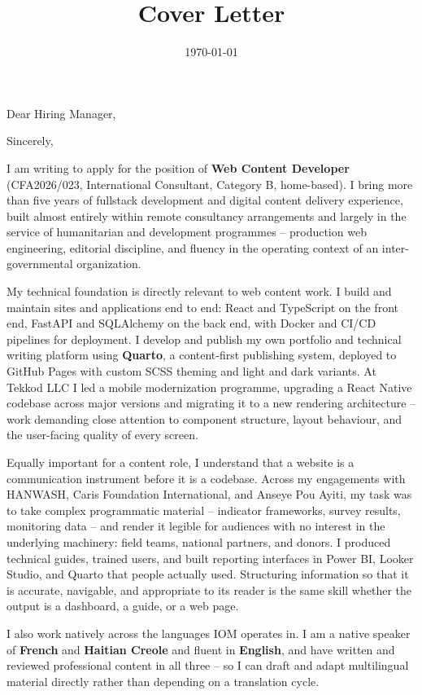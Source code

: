 \documentclass[11pt,a4paper,sans]{moderncv}
\title{Cover Letter}
\begin{document}
\date{\today}
\opening{Dear Hiring Manager,}
\closing{Sincerely,}

\makelettertitle

I am writing to apply for the position of \textbf{Web Content Developer} (CFA2026/023, International Consultant, Category B, home-based). I bring more than five years of fullstack development and digital content delivery experience, built almost entirely within remote consultancy arrangements and largely in the service of humanitarian and development programmes -- production web engineering, editorial discipline, and fluency in the operating context of an inter-governmental organization.

My technical foundation is directly relevant to web content work. I build and maintain sites and applications end to end: React and TypeScript on the front end, FastAPI and SQLAlchemy on the back end, with Docker and CI/CD pipelines for deployment. I develop and publish my own portfolio and technical writing platform using \textbf{Quarto}, a content-first publishing system, deployed to GitHub Pages with custom SCSS theming and light and dark variants. At Tekkod LLC I led a mobile modernization programme, upgrading a React Native codebase across major versions and migrating it to a new rendering architecture -- work demanding close attention to component structure, layout behaviour, and the user-facing quality of every screen.

Equally important for a content role, I understand that a website is a communication instrument before it is a codebase. Across my engagements with HANWASH, Caris Foundation International, and Anseye Pou Ayiti, my task was to take complex programmatic material -- indicator frameworks, survey results, monitoring data -- and render it legible for audiences with no interest in the underlying machinery: field teams, national partners, and donors. I produced technical guides, trained users, and built reporting interfaces in Power BI, Looker Studio, and Quarto that people actually used. Structuring information so that it is accurate, navigable, and appropriate to its reader is the same skill whether the output is a dashboard, a guide, or a web page.

I also work natively across the languages IOM operates in. I am a native speaker of \textbf{French} and \textbf{Haitian Creole} and fluent in \textbf{English}, and have written and reviewed professional content in all three -- so I can draft and adapt multilingual material directly rather than depending on a translation cycle.
\end{document}
